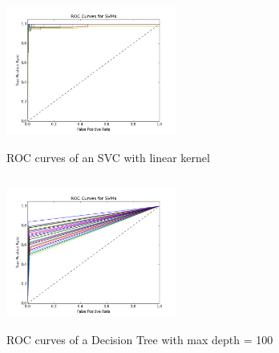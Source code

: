 \documentclass{article}
\begin{document}
\begin{figure}[H]
	\centering
	\includegraphics[width=0.5\textwidth, height= 5cm]{roc_svm_francisco__svm.png}
	\caption{ROC curves of an SVC with linear kernel}
\end{figure} 
\begin{figure}[H]
	\centering
	\includegraphics[width=0.5\textwidth, height= 5cm]{roc_tree1_dt.png}
	\caption{ROC curves of a Decision Tree with max depth = 100}
\end{figure} 
\end{document}
